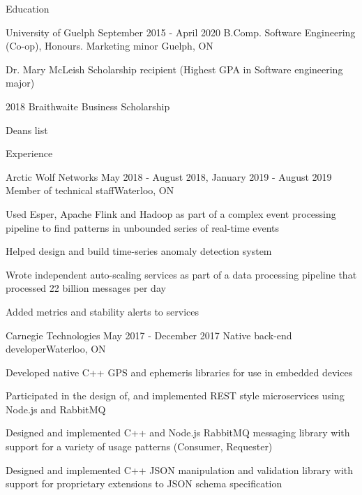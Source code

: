 \documentclass{resume}
\begin{document}
  \begin{rSection}{Education}
    \begin{rSubsection}{University of Guelph}
    	{September 2015 - April 2020}
    	{ B.Comp. Software Engineering (Co-op), Honours. Marketing minor }{Guelph, ON}
    	\item { Dr. Mary McLeish Scholarship recipient (Highest GPA in Software engineering major)} 
    	\item { 2018 Braithwaite Business Scholarship} 
    	\item { Deans list }
	\end{rSubsection}
  \end{rSection}

  \begin{rSection}{Experience}
    \begin{rSubsection}{Arctic Wolf Networks}
    	{May 2018 - August 2018, January 2019 - August 2019}
    	{Member of technical staff}{Waterloo, ON}
    	\item Used Esper, Apache Flink and Hadoop as part of a complex event processing pipeline 
    		to find patterns in unbounded series of real-time events
    	\item Helped design and build time-series anomaly detection system
    	\item Wrote independent auto-scaling services as part of a data processing pipeline that 
    		processed 22 billion messages per day
    	\item Added metrics and stability alerts to services
    \end{rSubsection}

    \begin{rSubsection}{Carnegie Technologies}
    	{May 2017 - December 2017}
    	{Native back-end developer}{Waterloo, ON}
    	\item Developed native C++ GPS and ephemeris libraries for use in embedded devices
    	\item Participated in the design of, and implemented REST style microservices using 
    		Node.js and RabbitMQ
    	\item Designed and implemented C++ and Node.js RabbitMQ messaging library with 
    		support for a variety of usage patterns (Consumer, Requester)
    	\item Designed and implemented C++ JSON manipulation and validation library with 
    		support for proprietary extensions to JSON schema specification
    \end{rSubsection}
  \end{rSection}
\end{document}
